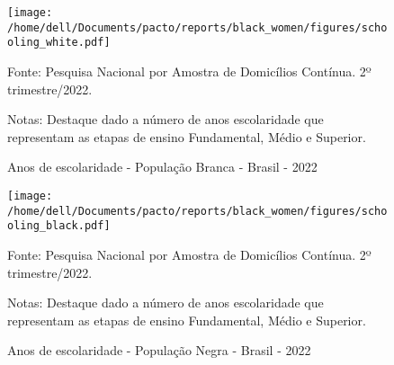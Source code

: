 \documentclass[12pt]{article}
\begin{document}
\begin{figure}[H]
    \centering
    \caption{Anos de escolaridade - População Branca - Brasil - 2022}
        \texttt{[image: /home/dell/Documents/pacto/reports/black\_women/figures/schooling\_white.pdf]}
    \label{fig:white_schooling}
    \begin{floatnotes}
        \item[Fonte:] Pesquisa Nacional por Amostra de Domicílios Contínua. 2º trimestre/2022.
        \item[Notas:] Destaque dado a número de anos escolaridade que representam as etapas de ensino Fundamental, Médio e Superior.
    \end{floatnotes}
\end{figure}

\begin{figure}[H]
    \centering
    \caption{Anos de escolaridade - População Negra - Brasil - 2022}
        \texttt{[image: /home/dell/Documents/pacto/reports/black\_women/figures/schooling\_black.pdf]}
    \label{fig:black_schooling}
    \begin{floatnotes}
        \item[Fonte:] Pesquisa Nacional por Amostra de Domicílios Contínua. 2º trimestre/2022.
        \item[Notas:] Destaque dado a número de anos escolaridade que representam as etapas de ensino Fundamental, Médio e Superior.
    \end{floatnotes}
\end{figure}

\printbibliography[title={Bibliografia}, nottype=misc]
\end{document}
